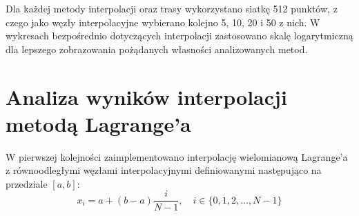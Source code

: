 \documentclass[a4paper,12pt]{article}
\begin{document}
  \begin{figure}[H]
    \centering
  \end{figure}
  \par Dla każdej metody interpolacji oraz trasy wykorzystano siatkę 512 punktów, z czego jako węzły interpolacyjne wybierano kolejno 5, 10, 20 i 50 z nich. W wykresach bezpośrednio dotyczących interpolacji zastosowano skalę logarytmiczną dla lepszego zobrazowania pożądanych własności analizowanych metod.
  
\section{Analiza wyników interpolacji metodą Lagrange'a}
	W pierwszej kolejności zaimplementowano interpolację wielomianową Lagrange'a z równoodległymi węzłami interpolacyjnymi definiowanymi następująco na przedziale $[a, b]$:
		\begin{equation}
	x_i = a + (b-a)\frac{i}{N-1}, \quad i \in \{0, 1, 2, \dots, N-1\}
	\end{equation}
	
\end{document}
